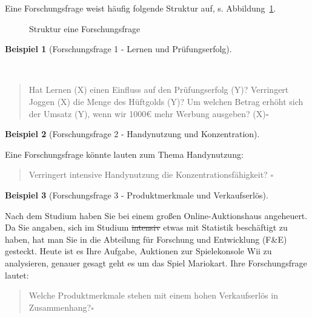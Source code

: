 \documentclass[
  letterpaper,
]{scrbook}
\theoremstyle{definition}
\theoremstyle{definition}
\newtheorem{example}{Beispiel}[chapter]
\theoremstyle{definition}
\theoremstyle{remark}
\begin{document}
Eine Forschungsfrage weist häufig folgende Struktur auf, s.
Abbildung~\ref{fig-fo-struktur}.

\begin{figure}


\caption{\label{fig-fo-struktur}Struktur eine Forschungsfrage}

\end{figure}%

\begin{example}[Forschungsfrage 1 - Lernen und
Prüfungserfolg]\protect\hypertarget{exm-fofrage1}{}\label{exm-fofrage1}

~

\begin{quote}
Hat Lernen (X) einen Einfluss auf den Prüfungserfolg (Y)? Verringert
Joggen (X) die Menge des Hüftgolds (Y)? Um welchen Betrag erhöht sich
der Umsatz (Y), wenn wir 1000€ mehr Werbung ausgeben? (X)\(\square\)
\end{quote}

\end{example}

\begin{example}[Forschungsfrage 2 - Handynutzung und
Konzentration]\protect\hypertarget{exm-braindrain}{}\label{exm-braindrain}

Eine Forschungsfrage könnte lauten zum Thema Handynutzung:

\begin{quote}
Verringert intensive Handynutzung die Konzentrationsfähigkeit?
\(\square\)
\end{quote}

\end{example}

\begin{example}[Forschungsfrage 3 - Produktmerkmale und
Verkaufserlös]\protect\hypertarget{exm-fofrage2}{}\label{exm-fofrage2}

Nach dem Studium haben Sie bei einem großen Online-Auktionshaus
angeheuert. Da Sie angaben, sich im Studium \st{intensiv} etwas mit
Statistik beschäftigt zu haben, hat man Sie in die Abteilung für
Forschung und Entwicklung (F\&E) gesteckt. Heute ist es Ihre Aufgabe,
Auktionen zur Spielekonsole Wii zu analysieren, genauer gesagt geht es
um das Spiel Mariokart. Ihre Forschungsfrage lautet:

\begin{quote}
Welche Produktmerkmale stehen mit einem hohen Verkaufserlös in
Zusammenhang?\(\square\)
\end{quote}

\end{example}
\end{document}
